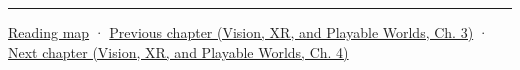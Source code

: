 \begin{center}\rule{0.5\linewidth}{0.5pt}\end{center}

\hyperref[volume-reading-map]{Reading map} · \href{../07-Vision-XR-and-Playable-Worlds/main.pdf\#nameddest=04-visual-computing-ii-ch032-pose-estimation-and-robust-fitting}{Previous chapter (Vision, XR, and Playable Worlds, Ch. 3)} · \href{../07-Vision-XR-and-Playable-Worlds/main.pdf\#nameddest=04-visual-computing-ii-ch034-learned-3d-shapes-and-scene-representations}{Next chapter (Vision, XR, and Playable Worlds, Ch. 4)}
